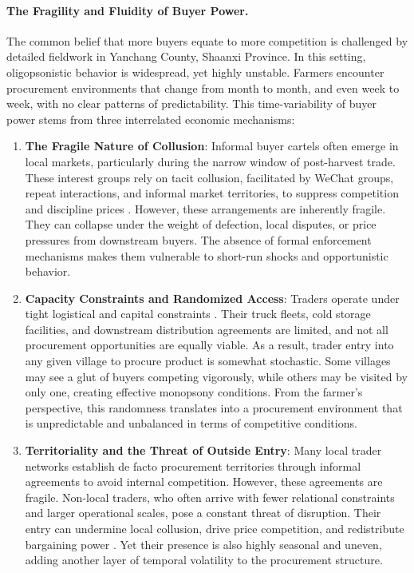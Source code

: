 \paragraph{The Fragility and Fluidity of Buyer Power.}
The common belief that more buyers equate to more competition is challenged by detailed fieldwork in Yanchang County, Shaanxi Province. In this setting, oligopsonistic behavior is widespread, yet highly unstable. Farmers encounter procurement environments that change from month to month, and even week to week, with no clear patterns of predictability. This time-variability of buyer power stems from three interrelated economic mechanisms:
\begin{enumerate}
    \item \textbf{The Fragile Nature of Collusion}: Informal buyer cartels often emerge in local markets, particularly during the narrow window of post-harvest trade. These interest groups rely on tacit collusion, facilitated by WeChat groups, repeat interactions, and informal market territories, to suppress competition and discipline prices \citep{macchiavello2015value}. However, these arrangements are inherently fragile. They can collapse under the weight of defection, local disputes, or price pressures from downstream buyers. The absence of formal enforcement mechanisms makes them vulnerable to short-run shocks and opportunistic behavior.

    \item \textbf{Capacity Constraints and Randomized Access}: Traders operate under tight logistical and capital constraints \citep{ambler2023finance}. Their truck fleets, cold storage facilities, and downstream distribution agreements are limited, and not all procurement opportunities are equally viable. As a result, trader entry into any given village to procure product is somewhat stochastic. Some villages may see a glut of buyers competing vigorously, while others may be visited by only one, creating effective monopsony conditions. From the farmer's perspective, this randomness translates into a procurement environment that is unpredictable and unbalanced in terms of competitive conditions.

    \item \textbf{Territoriality and the Threat of Outside Entry}: Many local trader networks establish de facto procurement territories through informal agreements to avoid internal competition. However, these agreements are fragile. Non-local traders, who often arrive with fewer relational constraints and larger operational scales, pose a constant threat of disruption. Their entry can undermine local collusion, drive price competition, and redistribute bargaining power \citep{BARTKUS2022}. Yet their presence is also highly seasonal and uneven, adding another layer of temporal volatility to the procurement structure.
\end{enumerate}

